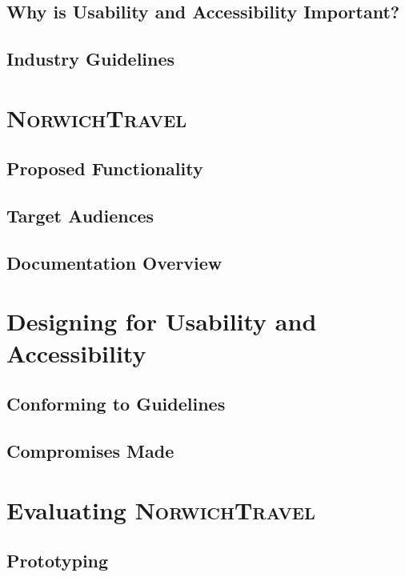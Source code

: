 \documentclass[cmpstyle]{ueacmpstyle}
\newcommand{\nt}{\textsc{NorwichTravel}}
\begin{document}
	
		\subsection{Why is Usability and Accessibility Important?}
		
		
		\subsection{Industry Guidelines}
	\section{\nt}
	
		\subsection{Proposed Functionality}
		
		\subsection{Target Audiences}
		
		\subsection{Documentation Overview}
	\section{Designing for Usability and Accessibility}
	
		\subsection{Conforming to Guidelines}
		
		\subsection{Compromises Made}
	\section{Evaluating \nt}
	
		\subsection{Prototyping}
		
\end{document}
